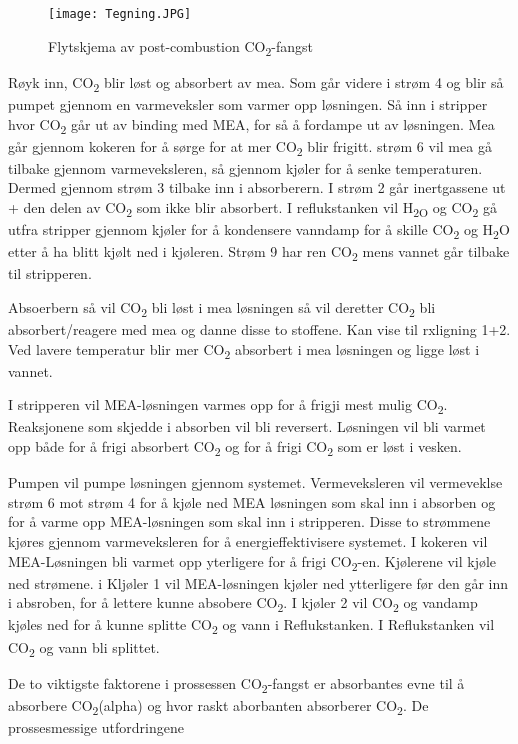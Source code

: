 \begin{figure}[h]  
\texttt{[image: Tegning.JPG]}
\centering
\caption{Flytskjema av post-combustion CO\textsubscript{2}-fangst}
\end{figure}

Røyk inn, CO\textsubscript{2} blir løst og absorbert av mea. Som går videre i strøm 4 og blir så pumpet gjennom en varmeveksler som varmer opp løsningen. Så inn i stripper hvor CO\textsubscript{2} går ut av binding med MEA, for så å fordampe ut av løsningen. Mea går gjennom kokeren for å sørge for at mer CO\textsubscript{2} blir frigitt. strøm 6 vil mea gå tilbake gjennom varmeveksleren, så gjennom kjøler for å senke temperaturen. Dermed gjennom strøm 3 tilbake inn i absorberern. I strøm 2 går inertgassene ut + den delen av CO\textsubscript{2} som ikke blir absorbert. 
I reflukstanken vil H\textsubscript{2O} og CO\textsubscript{2} gå utfra stripper gjennom kjøler for å kondensere vanndamp for å skille CO\textsubscript{2} og H\textsubscript{2}O etter å ha blitt kjølt ned i kjøleren. 
Strøm 9 har ren CO\textsubscript{2} mens vannet går tilbake til stripperen. 


Absoerbern så vil CO\textsubscript{2} bli løst i mea løsningen så vil deretter CO\textsubscript{2} bli absorbert/reagere med mea og danne disse to stoffene. Kan vise til rxligning 1+2. Ved lavere temperatur blir mer CO\textsubscript{2} absorbert i mea løsningen og ligge løst i vannet.

I stripperen vil MEA-løsningen varmes opp for å frigji mest mulig CO\textsubscript{2}. Reaksjonene som skjedde i absorben vil bli reversert. Løsningen vil bli varmet opp både for å frigi absorbert CO\textsubscript{2} og for å frigi CO\textsubscript{2} som er løst i vesken. 

Pumpen vil pumpe løsningen gjennom systemet. Vermeveksleren vil vermeveklse strøm 6 mot strøm 4 for å kjøle ned MEA løsningen som skal inn i absorben og for å  varme opp MEA-løsningen som skal inn i stripperen. Disse to strømmene kjøres gjennom varmeveksleren for å energieffektivisere systemet. I kokeren vil MEA-Løsningen bli varmet opp yterligere for å frigi CO\textsubscript{2}-en. Kjølerene vil kjøle ned strømene. i Kljøler 1 vil MEA-løsningen kjøler ned ytterligere før den går inn i absroben, for å lettere kunne absobere CO\textsubscript{2}. I kjøler 2 vil CO\textsubscript{2} og vandamp kjøles ned for å kunne splitte CO\textsubscript{2} og vann i Reflukstanken. I Reflukstanken vil CO\textsubscript{2} og vann bli splittet. 

De to viktigste faktorene i prossessen CO\textsubscript{2}-fangst er absorbantes evne til å absorbere CO\textsubscript{2}(alpha) og hvor raskt aborbanten absorberer CO\textsubscript{2}. De prossesmessige utfordringene 